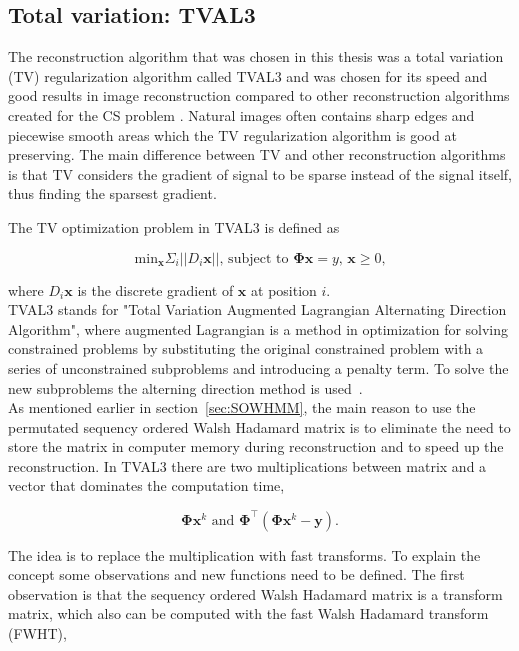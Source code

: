 \subsection{Total variation: TVAL3}
\label{sec:TV}
The reconstruction algorithm that was chosen in this thesis was a total variation (TV) regularization algorithm called TVAL3 and was chosen for its speed and good results in image reconstruction compared to other reconstruction algorithms created for the CS problem \cite{article:TVAL3}. Natural images often contains sharp edges and piecewise smooth areas which the TV regularization algorithm is good at preserving. The main difference between TV and other reconstruction algorithms is that TV considers the gradient of signal to be sparse instead of the signal itself, thus finding the sparsest gradient. 

The TV optimization problem in TVAL3 is defined as  

\begin{equation}
\text{min}_\mathbf{x} \Sigma_i ||D_i \mathbf{x} || \text{, subject to } \mathbf{\Phi x} = 	y \text{, } \mathbf{x} \geq 0 \text{,} 
\label{eq:tval3}
\end{equation}

where $D_i\mathbf{x}$ is the discrete gradient of $\mathbf{x}$ at position $i$.\\[0.1in]

TVAL3 stands for "Total Variation Augmented Lagrangian Alternating Direction Algorithm", where augmented Lagrangian is a method in optimization for solving constrained problems by substituting the original constrained problem with a series of unconstrained subproblems and introducing a penalty term. To solve the new subproblems the alterning direction method is used~\cite{article:TVAL3}.\\[0.1in]

As mentioned earlier in section~\ref{sec:SOWHMM}, the main reason to use the permutated sequency ordered Walsh Hadamard matrix is to eliminate the need to store the matrix in computer memory during reconstruction and to speed up the reconstruction. In TVAL3 there are two multiplications between matrix and a vector that dominates the computation time,

\begin{equation}
\mathbf{\Phi}\mathbf{x}^k \text{ and } \mathbf{\Phi}^\top(\mathbf{\Phi}\mathbf{x}^k-\mathbf{y})\text{.}
\end{equation}

The idea is to replace the multiplication with fast transforms. To explain the concept some observations and new functions need to be defined. The first observation is that the sequency ordered Walsh Hadamard matrix is a transform matrix, which also can be computed with the fast Walsh Hadamard transform (FWHT),

